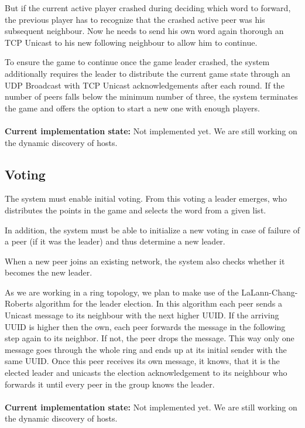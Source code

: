 \documentclass[runningheads]{llncs}
\begin{document}
        But if the current active player crashed during deciding which word to forward, the previous player has to recognize that the crashed active peer was his subsequent neighbour. Now he needs to send his own word again thorough an TCP Unicast to his new following neighbour to allow him to continue.
        
        To ensure the game to continue once the game leader crashed, the system additionally requires the leader to distribute the current game state through an UDP Broadcast with TCP Unicast acknowledgements after each round. If the number of peers falls below the minimum number of three, the system terminates the game and offers the option to start a new one with enough players.
        \\\\
      \textbf{Current implementation state:} Not implemented yet. We are still working on the dynamic discovery of hosts.
        
    
    \subsection{Voting}
        The system must enable initial voting. From this voting a leader emerges, who distributes the points in the game and selects the word from a given list.
        
        In addition, the system must be able to initialize a new voting in case of failure of a peer (if it was the leader) and thus determine a new leader.
    
        When a new peer joins an existing network, the system also checks whether it becomes the new leader.
        
        As we are working in a ring topology, we plan to make use of the LaLann-Chang-Roberts algorithm for the leader election. In this algorithm each peer sends a Unicast message to its neighbour with the next higher UUID. If the arriving UUID is higher then the own, each peer forwards the message in the following step again to its neighbor. If not, the peer drops the message. This way only one message goes through the whole ring and ends up at its initial sender with the same UUID. Once this peer receives its own message, it knows, that it is the elected leader and unicasts the election acknowledgement to its neighbour who forwards it until every peer in the group knows the leader.
        \\\\
        \textbf{Current implementation state:} Not implemented yet. We are still working on the dynamic discovery of hosts.
        
\end{document}
